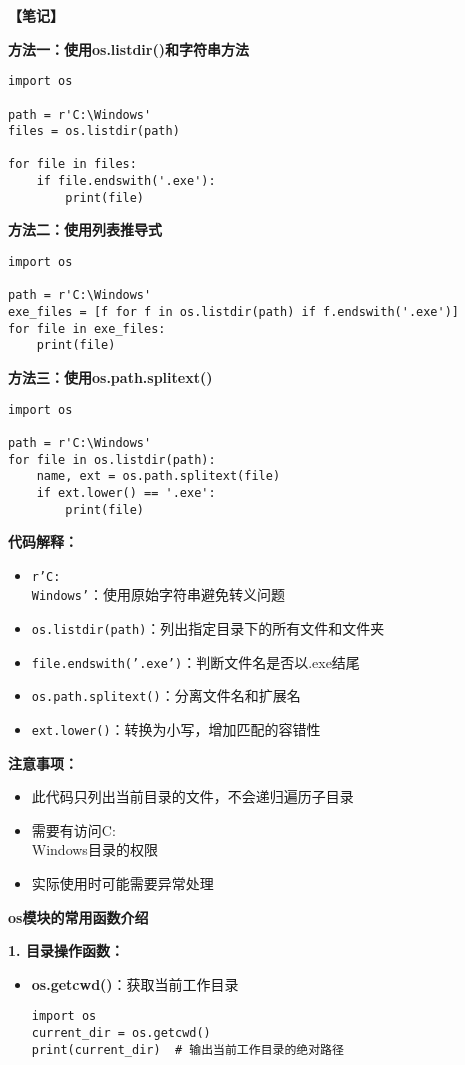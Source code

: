 \begin{mdframed}
  \textbf{\color{red}【笔记】}

  \textbf{方法一：使用os.listdir()和字符串方法}
  \begin{lstlisting}
import os

path = r'C:\Windows'
files = os.listdir(path)

for file in files:
    if file.endswith('.exe'):
        print(file)
  \end{lstlisting}

  \textbf{方法二：使用列表推导式}
  \begin{lstlisting}
import os

path = r'C:\Windows'
exe_files = [f for f in os.listdir(path) if f.endswith('.exe')]
for file in exe_files:
    print(file)
  \end{lstlisting}

  \textbf{方法三：使用os.path.splitext()}
  \begin{lstlisting}
import os

path = r'C:\Windows'
for file in os.listdir(path):
    name, ext = os.path.splitext(file)
    if ext.lower() == '.exe':
        print(file)
  \end{lstlisting}

  \textbf{代码解释：}
  \begin{itemize}
    \item \texttt{r'C:\\Windows'}：使用原始字符串避免转义问题
    \item \texttt{os.listdir(path)}：列出指定目录下的所有文件和文件夹
    \item \texttt{file.endswith('.exe')}：判断文件名是否以.exe结尾
    \item \texttt{os.path.splitext()}：分离文件名和扩展名
    \item \texttt{ext.lower()}：转换为小写，增加匹配的容错性
  \end{itemize}

  \textbf{注意事项：}
  \begin{itemize}
    \item 此代码只列出当前目录的文件，不会递归遍历子目录
    \item 需要有访问C:\\Windows目录的权限
    \item 实际使用时可能需要异常处理
  \end{itemize}

  \textbf{os模块的常用函数介绍}

  \textbf{1. 目录操作函数：}
  \begin{itemize}
    \item \textbf{os.getcwd()}：获取当前工作目录
    \begin{lstlisting}
import os
current_dir = os.getcwd()
print(current_dir)  # 输出当前工作目录的绝对路径
    \end{lstlisting}


\end{itemize}
\end{mdframed}

